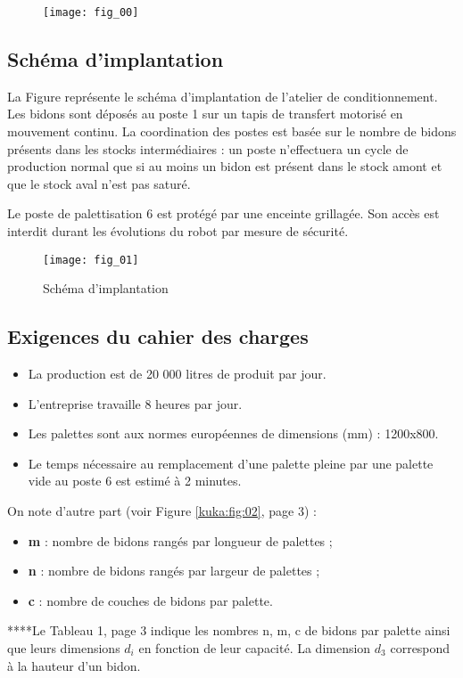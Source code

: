 \begin{figure}[H]
\centering
\texttt{[image: fig\_00]}
\end{figure}


\subsection{Schéma d’implantation}
La Figure \label{kuka:kuka:fig:01} représente le schéma d’implantation de l’atelier de conditionnement. Les 
bidons sont déposés au poste 1 sur un tapis de transfert motorisé en mouvement continu. La 
coordination des postes est basée sur le nombre de bidons présents dans les stocks 
intermédiaires : un poste n’effectuera un cycle de production normal que si au moins un bidon 
est présent dans le stock amont et que le stock aval n’est pas saturé.

Le poste de palettisation 6 est protégé par une enceinte grillagée. Son accès est interdit durant 
les évolutions du robot par mesure de sécurité. 


\begin{figure}[H]
\centering
\texttt{[image: fig\_01]}
\caption{Schéma d'implantation \label{kuka:fig:01}}
\end{figure}

\subsection{Exigences du cahier des charges}
\begin{itemize}
\item La production est de 20 000 litres de produit par jour. 
\item L’entreprise travaille 8 heures par jour. 
\item Les palettes sont aux normes européennes de dimensions (mm) : 1200x800. 
\item Le temps nécessaire au remplacement d’une palette pleine par une palette vide au 
poste 6 est estimé à 2 minutes. 
\end{itemize}
On note d’autre part (voir Figure \ref{kuka:fig:02}, page 3) :
\begin{itemize}
\item \textbf{m} : nombre de bidons rangés par longueur de palettes ; 
\item \textbf{n} : nombre de bidons rangés par largeur de palettes ; 
\item \textbf{c} : nombre de couches de bidons par palette. 
\end{itemize}
****Le Tableau 1, page 3 indique les nombres n, m, c de bidons par palette ainsi que leurs 
dimensions $d_i$ en fonction de leur capacité. La dimension $d_3$ correspond à la hauteur d’un 
bidon. 


